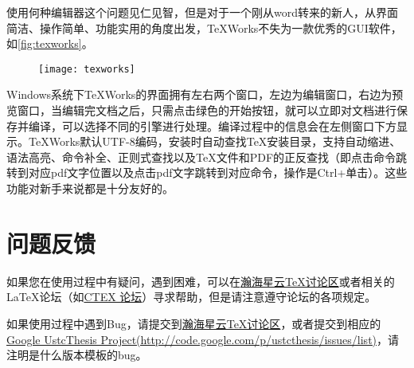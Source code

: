 使用何种编辑器这个问题见仁见智，但是对于一个刚从word转来的新人，从界面简洁、操作简单、功能实用的角度出发，TeXWorks不失为一款优秀的GUI软件，如\autoref{fig:texworks}。

\begin{figure}
\centering
\texttt{[image: texworks]}
\label{fig:texworks}
\end{figure}

Windows系统下TeXWorks的界面拥有左右两个窗口，左边为编辑窗口，右边为预览窗口，当编辑完文档之后，只需点击绿色的开始按钮，就可以立即对文档进行保存并编译，可以选择不同的引擎进行处理。编译过程中的信息会在左侧窗口下方显示。TeXWorks默认UTF-8编码，安装时自动查找TeX安装目录，支持自动缩进、语法高亮、命令补全、正则式查找以及TeX文件和PDF的正反查找（即点击命令跳转到对应pdf文字位置以及点击pdf文字跳转到对应命令，操作是Ctrl+单击）。这些功能对新手来说都是十分友好的。

\section{问题反馈}

如果您在使用过程中有疑问，遇到困难，可以在\href{http://bbs.ustc.edu.cn/cgi/bbsdoc?board=TeX}{瀚海星云\TeX{}讨论区}或者相关的\LaTeX 论坛（如\href{http://bbs.ctex.org}{CTEX 论坛}）寻求帮助，但是请注意遵守论坛的各项规定。

如果使用过程中遇到Bug，请提交到\href{http://bbs.ustc.edu.cn/cgi/bbsdoc?board=TeX}{瀚海星云\TeX{}讨论区}，或者提交到相应的\href{http://code.google.com/p/ustcthesis/issues/list}{Google UstcThesis Project(http://code.google.com/p/ustcthesis/issues/list)}，请注明是什么版本模板的bug。